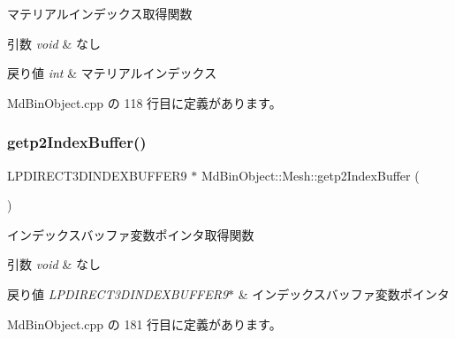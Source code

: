 マテリアルインデックス取得関数 


\begin{DoxyParams}{引数}
{\em void} & なし \\
\hline
\end{DoxyParams}

\begin{DoxyRetVals}{戻り値}
{\em int} & マテリアルインデックス \\
\hline
\end{DoxyRetVals}


 Md\+Bin\+Object.\+cpp の 118 行目に定義があります。

\mbox{\label{class_md_bin_object_1_1_mesh_a0028dae2742769687d2cc6c5a7f3518e}} 
\subsubsection{\texorpdfstring{getp2\+Index\+Buffer()}{getp2IndexBuffer()}}
{\footnotesize\ttfamily L\+P\+D\+I\+R\+E\+C\+T3\+D\+I\+N\+D\+E\+X\+B\+U\+F\+F\+E\+R9 $\ast$ Md\+Bin\+Object\+::\+Mesh\+::getp2\+Index\+Buffer (\begin{DoxyParamCaption}{ }\end{DoxyParamCaption})}



インデックスバッファ変数ポインタ取得関数 


\begin{DoxyParams}{引数}
{\em void} & なし \\
\hline
\end{DoxyParams}

\begin{DoxyRetVals}{戻り値}
{\em L\+P\+D\+I\+R\+E\+C\+T3\+D\+I\+N\+D\+E\+X\+B\+U\+F\+F\+E\+R9$\ast$} & インデックスバッファ変数ポインタ \\
\hline
\end{DoxyRetVals}


 Md\+Bin\+Object.\+cpp の 181 行目に定義があります。

\mbox{\label{class_md_bin_object_1_1_mesh_a0b0cc5058ce31c35d38a42c099615746}} 

